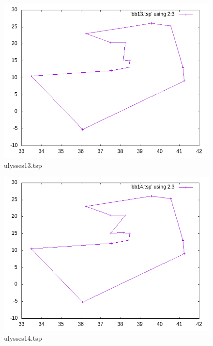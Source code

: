 \documentclass[12pt,spanish]{article}
\begin{document}
\begin{figure}[H]
\centering
\includegraphics[scale=0.75]{bb13.png}
\caption{ulysses13.tsp}
\end{figure}

\begin{figure}[H]
\centering
\includegraphics[scale=0.75]{bb14.png}
\caption{ulysses14.tsp}
\end{figure}
\end{document}

